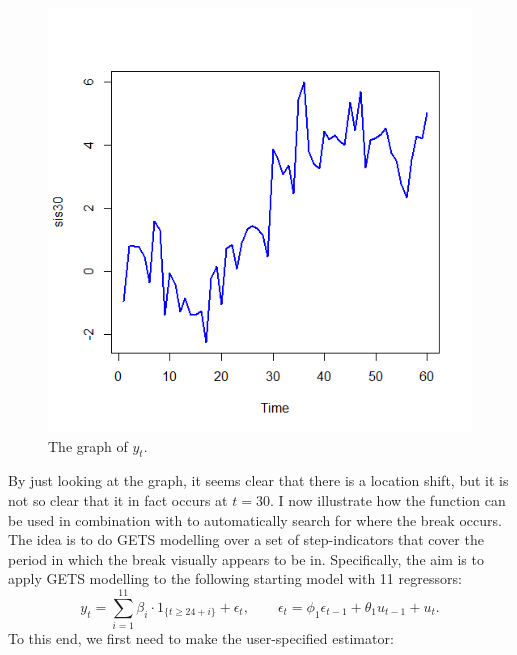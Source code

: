 \begin{figure}[htbp]
	\centering
	\includegraphics[scale=0.5]{step-shift}
	\caption{The graph of $y_t$.}
	\label{figure:step-shift}
\end{figure}
%
By just looking at the graph, it seems clear that there is a location shift, but it is not so clear that it in fact occurs at $t=30$. I now illustrate how the  function can be used in combination with  to automatically search for where the break occurs. %
The idea is to do GETS modelling over a set of step-indicators that cover the period in which the break visually appears to be in. Specifically, the aim is to apply GETS modelling to the following starting model with 11 regressors:
%
\begin{equation*}
	y_t = \sum_{i=1}^{11} \beta_i \cdot 1_{ \{ t \geq 24+i \} } + \epsilon_t, \qquad \epsilon_t = \phi_1 \epsilon_{t-1} + \theta_1 u_{t-1} + u_t.
\end{equation*} 
%
To this end, we first need to make the user-specified estimator:
%
